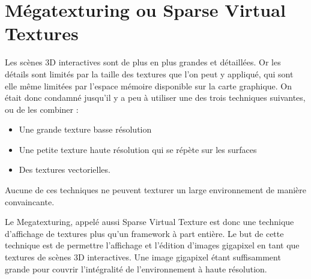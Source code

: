	\section{Mégatexturing ou Sparse Virtual Textures}
		Les scènes 3D interactives sont de plus en plus grandes et détaillées. Or les détails sont limités par la taille des textures que l'on peut y
		appliqué, qui sont elle même limitées par l'espace mémoire disponible sur la carte graphique. On était donc condamné jusqu'il y a peu à utiliser
		une des trois techniques suivantes, ou de les combiner : 
		\begin{itemize}
			\item Une grande texture basse résolution
			\item Une petite texture haute résolution qui se répète sur les surfaces
			\item Des textures vectorielles.
		\end{itemize}
		Aucune de ces techniques ne peuvent texturer un large environnement de manière convaincante. 

		Le Megatexturing, appelé aussi Sparse Virtual Texture est donc une technique d'affichage de textures plus qu'un framework à part entière. Le but de 
		cette technique est de permettre l'affichage et l'édition d'images gigapixel en tant que textures de scènes 3D interactives. Une image gigapixel
		étant suffisamment grande  pour couvrir l'intégralité de l'environnement à haute résolution.

